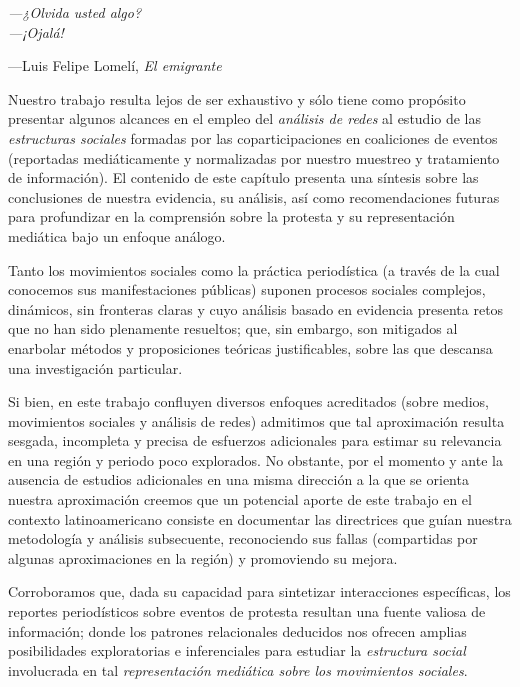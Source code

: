 \documentclass[letterpaper, 11pt]{book}
\theoremstyle{definition}
\theoremstyle{remark}
\begin{document}
\epigraph{\itshape ---¿Olvida usted algo?\\---¡Ojalá!}{---Luis Felipe Lomelí, \textit{El emigrante}}

\begingroup
\small
    Nuestro trabajo resulta lejos de ser exhaustivo y sólo tiene como propósito presentar algunos alcances en el empleo del \emph{análisis de redes} al estudio de las \emph{estructuras sociales} formadas por las coparticipaciones en coaliciones de eventos (reportadas mediáticamente y normalizadas por nuestro muestreo y tratamiento de información). 
    El contenido de este capítulo presenta una síntesis sobre las conclusiones de nuestra evidencia, su análisis, así como recomendaciones futuras para profundizar en la comprensión sobre la protesta y su representación mediática bajo un enfoque análogo.
\vspace{2em}
\endgroup


Tanto los movimientos sociales como la práctica periodística (a través de la cual conocemos sus manifestaciones públicas) suponen procesos sociales complejos, dinámicos, sin fronteras claras y cuyo análisis basado en evidencia presenta retos que no han sido plenamente resueltos;
que, sin embargo, son mitigados al enarbolar métodos y proposiciones teóricas justificables, sobre las que descansa una investigación particular. 


Si bien, en este trabajo confluyen diversos enfoques acreditados (sobre medios, movimientos sociales y análisis de redes) admitimos que tal aproximación resulta sesgada, incompleta y precisa de esfuerzos adicionales para estimar su relevancia en una región y periodo poco explorados. 
No obstante, por el momento y ante la ausencia de estudios adicionales en una misma dirección a la que se orienta nuestra aproximación creemos que un potencial aporte de este trabajo en el contexto latinoamericano consiste en documentar las directrices que guían nuestra metodología y análisis subsecuente, reconociendo sus fallas (compartidas por algunas aproximaciones en la región) y promoviendo su mejora. 


Corroboramos que, dada su capacidad para sintetizar interacciones específicas, los reportes periodísticos sobre eventos de protesta resultan una fuente valiosa de información; donde los patrones relacionales deducidos nos ofrecen amplias posibilidades exploratorias e inferenciales para estudiar la \emph{estructura social} involucrada en tal \emph{representación mediática sobre los movimientos sociales}.
\end{document}
